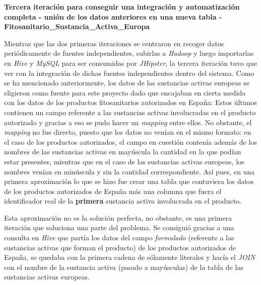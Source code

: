 \par 
\textbf{Tercera iteración para conseguir una integración y automatización completa - unión de los datos anteriores en una nueva tabla - Fitosanitario\_Sustancia\_Activa\_Europa}
\bigskip
\par 
Mientras que las dos primeras iteraciones se centraron en recoger datos periódicamente de fuentes independientes, subirlas a \textit{Hadoop} y luego importarlas en \textit{Hive} y \textit{MySQL} para ser consumidas por \textit{JHipster}, la tercera iteración tuvo que ver con la integración de dichas fuentes independientes dentro del sistema. Como se ha mencionado anteriormente, los datos de las sustancias activas europeas se eligieron como fuente para este proyecto dado que encajaban en cierta medida con los datos de los productos fitosanitarios autorizados en España:  Estos últimos contienen un campo referente a las sustancias activas involucradas en el producto autorizado y gracias a eso se pudo hacer un \textit{mapping} entre ellos. No obstante, el \textit{mapping} no fue directo, puesto que los datos no venían en el mismo formato: en el caso de los productos autorizados, el campo en cuestión contenía además de los nombres de las sustancias activas en mayúscula la cantidad en la que podían estar presentes, mientras que en el caso de las sustancias activas europeas, los nombres venían en minúscula y sin la cantidad correspondiente. Así pues, en una primera aproximación lo que se hizo fue crear una tabla que contuviera los datos de los productos autorizados de España más una columna que fuera el identificador real de la \textbf{primera} sustancia activa involucrada en el producto. \par Esta aproximación no es la solución perfecta, no obstante, es una primera iteración que soluciona una parte del problema. Se consiguió gracias a una consulta en \textit{Hive} que partía los datos del campo \textit{formulado} (referente a las sustancias activas que forman el producto) de los productos autorizados de España, se quedaba con la primera cadena de sólamente literales y hacía el \textit{JOIN} con el nombre de la sustancia activa (pasado a mayúsculas) de la tabla de las sustancias activas europeas. 
